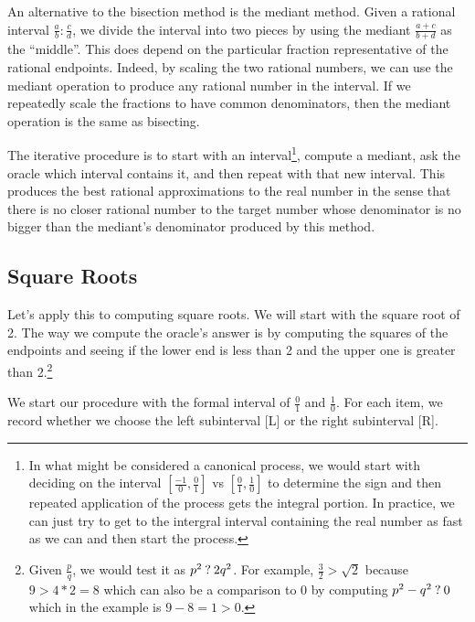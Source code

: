 \documentclass[12pt]{article}
\begin{document}
An alternative to the bisection method is the mediant method. Given a rational interval $\frac{a}{b} : \frac{c}{d}$, we divide the interval into two pieces by using the mediant $\frac{a+c}{b+d}$ as the ``middle''. This does depend on the particular fraction representative of the rational endpoints. Indeed, by scaling the two rational numbers, we can use the mediant operation to produce any rational number in the interval. If we repeatedly scale the fractions to have common denominators, then the mediant operation is the same as bisecting. 

The iterative procedure is to start with an interval\footnote{In what might be considered a canonical process, we would start with deciding on the interval $[\frac{-1}{0}, \frac{0}{1}]$ vs $[\frac{0}{1}, \frac{1}{0}]$ to determine the sign and then repeated application of the process gets the integral portion. In practice, we can just try to get to the intergral interval containing the real number as fast as we can and then start the process.}, compute a mediant, ask the oracle which interval contains it, and then repeat with that new interval. This produces the best rational approximations to the real number in the sense that there is no closer rational number to the target number whose denominator is no bigger than the mediant's denominator produced by this method. 


\subsection{Square Roots}

Let's apply this to computing square roots. We will start with the square root of 2. The way we compute the oracle's answer is by computing the squares of the endpoints and seeing if the lower end is less than 2 and the upper one is greater than 2.\footnote{Given $\frac{p}{q}$, we would test it as $p^2 \mathbin{?} 2q^2$. For example, $\frac{3}{2} > \sqrt{2}$ because $9 > 4*2 = 8$ which can also be a comparison to 0 by computing $p^2 - q^2 \mathbin{?} 0$ which in the example is $9-8=1 > 0$.}

We start our procedure with the formal interval of $\tfrac{0}{1}$ and $\tfrac{1}{0}$. For each item, we record whether we choose the left subinterval [L] or the right subinterval [R]. 
\end{document}
